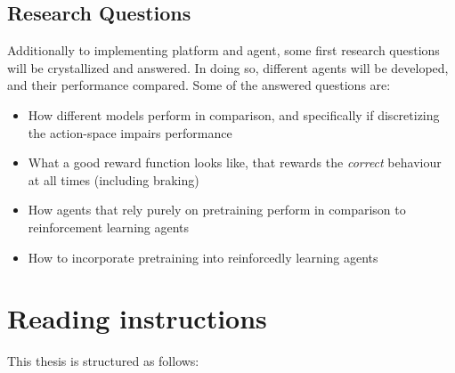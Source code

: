 \subsection{Research Questions}

\label{sec:researchquestions}

Additionally to implementing platform and agent, some first research questions will be crystallized and answered. In doing so, different agents will be developed, and their performance compared. Some of the answered questions are:
\begin{itemize}
	\item How different models perform in comparison, and specifically if discretizing the action-space impairs performance
	\item What a good reward function looks like, that rewards the \textit{correct} behaviour at all times (including braking)
	\item How agents that rely purely on pretraining perform in comparison to reinforcement learning agents
	\item How to incorporate pretraining into reinforcedly learning agents
\end{itemize}

\section{Reading instructions}

This thesis is structured as follows:


